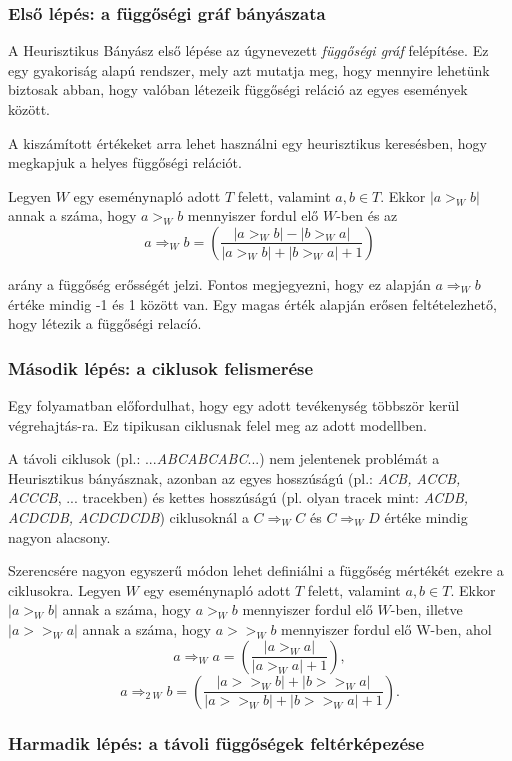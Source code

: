 \subsubsection{Első lépés: a függőségi gráf bányászata}

 A Heurisztikus Bányász első lépése az úgynevezett \textit{függőségi gráf} felépítése. Ez egy gyakoriság alapú rendszer, mely azt mutatja meg, hogy mennyire lehetünk biztosak abban, hogy valóban létezeik függőségi reláció az egyes események között.

A kiszámított értékeket arra lehet használni egy heurisztikus keresésben, hogy megkapjuk a helyes függőségi relációt.

Legyen $W$ egy eseménynapló adott $T$ felett, valamint $a,b \in T$. Ekkor $|a>_W b|$ annak a száma, hogy $a>_Wb$ mennyiszer fordul elő $W$-ben és az
\[
a \Rightarrow_W b = \left(\frac{|a>_Wb|-|b>_Wa|}{|a>_Wb|+|b>_Wa|+1}\right)
\]

arány a függőség erősségét jelzi. Fontos megjegyezni, hogy ez alapján $a\Rightarrow_Wb$ értéke mindig -1 és 1 között van. Egy magas érték alapján erősen feltételezhető, hogy létezik a függőségi relacíó.

\subsubsection{Második lépés: a ciklusok felismerése}

Egy folyamatban előfordulhat, hogy egy adott tevékenység többször kerül végrehajtás\hyp{}ra. Ez tipikusan ciklusnak felel meg az adott modellben.

A távoli ciklusok (pl.: ...\textit{ABCABCABC}...) nem jelentenek problémát a Heurisztikus bányásznak, azonban az egyes hosszúságú (pl.: \textit{ACB, ACCB, ACCCB}, ... tracekben) és kettes hosszúságú (pl. olyan tracek mint: \textit{ACDB, ACDCDB, ACDCDCDB}) ciklusoknál a $C\Rightarrow_WC$ és $C\Rightarrow_WD$ értéke mindig nagyon alacsony.

Szerencsére nagyon egyszerű módon lehet definiálni a függőség mértékét ezekre a ciklusokra. Legyen $W$ egy eseménynapló adott $T$ felett, valamint $a,b \in T$. Ekkor $|a>_W b|$ annak a száma, hogy $a>_Wb$ mennyiszer fordul elő $W$-ben, illetve $|a>>_Wa|$ annak a száma, hogy $a>>_Wb$ mennyiszer fordul elő W-ben, ahol
\[
a\Rightarrow_Wa=\left(\frac{|a>_Wa|}{|a>_Wa|+1}\right),
\]
\[
a\Rightarrow_{2\ W} b=\left(\frac{|a>>_Wb|+|b>>_Wa|}{|a>>_Wb|+|b>>_Wa|+1}\right).
\]

\subsubsection{Harmadik lépés: a távoli függőségek feltérképezése}


